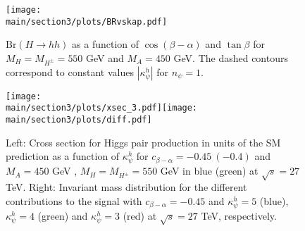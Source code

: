 %
 \begin{figure}
 \begin{center}
 \texttt{[image: \\main/section3/plots/BRvskap.pdf]}
 \caption{\label{fig:BRvskappa} $\text{Br}(H \to hh)$ as a function of $\cos(\beta-\alpha)$ and $ \tan\beta$ for $M_H=M_{H^\pm}=550$ GeV and $M_A=450$ GeV. The dashed contours correspond to constant values $|\kappa_{\psi}^h|$ for $n_{\psi}=1$.}
 \end{center}
  \vspace{-.6cm}
 \end{figure}
%
%
\begin{figure*}
\texttt{[image: \\main/section3/plots/xsec\_3.pdf]}\texttt{[image: \\main/section3/plots/diff.pdf]}
	\caption{\label{fig:xsecc} Left: Cross section for Higgs pair production in units of the SM prediction as a function of $\kappa_{\psi}^h$ for $c_{\beta-\alpha}=-0.45~(-0.4)$ and $M_A=450$ GeV , $M_H=M_{H^\pm}=550$ GeV in blue (green) at $\sqrt{s}=27 $ TeV. Right: Invariant mass distribution for the different contributions to the signal with $c_{\beta-\alpha}=-0.45$ and $\kappa^h_{\psi}=5$ (blue),  $\kappa_{\psi}^h=4$ (green) and $\kappa_{\psi}^h=3$ (red) at $\sqrt{s}=27 $ TeV, respectively.} 
	\label{fig:hhflavourxsanddistr}
\end{figure*}
%

